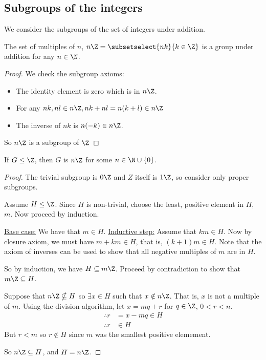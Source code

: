 \documentclass[../Main.tex]{subfiles}
\begin{document}
\subsection{Subgroups of the integers}
We consider the subgroups of the set of integers under addition.
\begin{proposition}
    The set of multiples of $n$, $n\Z = \subsetselect{nk}{k \in \Z}$ is a group under addition for any $n \in \N$.
\end{proposition}
\begin{proof}
    We check the subgroup axioms:
    \begin{itemize}
        \item The identity element is zero which is in $n\Z$.
        \item For any $nk, nl \in n\Z, nk+nl = n(k+l) \in n\Z$
        \item The inverse of $nk$ is $n(-k) \in n\Z$.
    \end{itemize}
    So $n\Z$ is a subgroup of $\Z$
\end{proof}
\begin{lemma}[Subgroups of $\Z$]
    If $G \leq \Z$, then $G$ is $n\Z$ for some $n \in \N \cup \{0\}$.
\end{lemma}
\begin{proof}
    The trivial subgroup is $0\Z$ and $Z$ itself is $1\Z$, so consider only proper subgroups.\par
    Assume $H \leq \Z$. Since $H$ is non-trivial, choose the least, positive element in $H$, $m$. Now proceed by induction.\par
    \underline{Base case:} We have that $m \in H$.
    \underline{Inductive step:} Assume that $km \in H$.
    Now by closure axiom, we must have $m + km \in H$, that is, $(k+1)m \in H$. Note that the axiom of inverses can be used to show that all negative multiples of $m$ are in $H$.\par
    So by induction, we have $H \subseteq m\Z$. Proceed by contradiction to show that $m\Z \subseteq H$.\par
    Suppose that $n\Z \nsubseteq H$ so $\exists x \in H$ such that $x \notin n\Z$. That is, $x$ is not a multiple of $m$. Using the division algorithm, let $x = m q + r$ for $q \in \Z$, $0 < r < n$.
    \begin{align*}
        \therefore r &= x - mq \in H \\
        \therefore r &\in H
    \end{align*}
    But $r < m$ so $r \notin H$ since $m$ was the smallest positive elemement. \contradiction\par
    So $n\Z \subseteq H$, and $H = n\Z$.
\end{proof}
\end{document}
